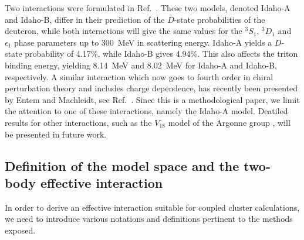 Two interactions were formulated in Ref.~\cite{machleidt02}. These two 
models, denoted Idaho-A and Idaho-B, differ in their prediction of the
$D$-state probabilities of the deuteron, while both interactions will 
give the same values for the $^3S_1$, $^3D_1$ and $\epsilon_1$ phase 
parameters up to 300~MeV in scattering energy. Idaho-A yields a $D$-state
probability of 4.17\%, while Idaho-B gives 4.94\%. This also affects
the triton binding energy, yielding 8.14~MeV and 8.02~MeV for Idaho-A
and Idaho-B, respectively. 
A similar interaction which now goes to  
fourth order in chiral perturbation theory and includes charge dependence,  
has recently been presented by Entem and Machleidt, see Ref.~\cite{machleidt03}.
Since this is a methodological paper, we limit the attention to one of 
these interactions, namely the Idaho-A model. Deatiled results 
for other interactions, such as
the $V_{18}$ model of the Argonne group \cite{bob95}, 
will be presented in future work. 


\subsection{Definition of the model space and the two-body effective interaction}

In order to derive an effective interaction suitable for coupled
cluster calculations, we need to introduce various
notations and definitions pertinent to the methods exposed.

